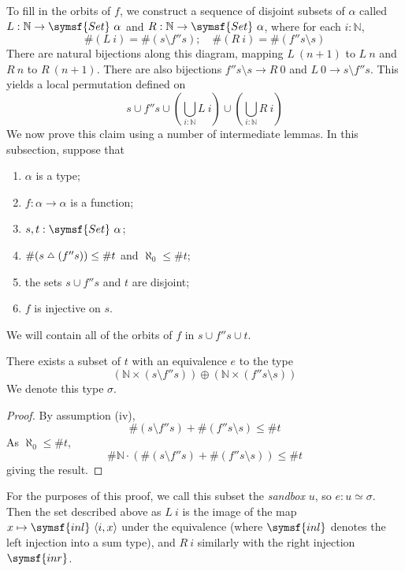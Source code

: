 To fill in the orbits of \( f \), we construct a sequence of disjoint subsets of \( \alpha \) called \( L : \mathbb N \to \symsf{Set}\ \alpha \) and \( R : \mathbb N \to \symsf{Set}\ \alpha \), where for each \( i : \mathbb N \),
\[ \#(L\ i) = \#(s \setminus f '' s);\quad \#(R\ i) = \#(f '' s \setminus s) \]
There are natural bijections along this diagram, mapping \( L\ (n + 1) \) to \( L\ n \) and \( R\ n \) to \( R\ (n + 1) \).
There are also bijections \( f '' s \setminus s \to R\ 0 \) and \( L\ 0 \to s \setminus f '' s \).
This yields a local permutation defined on
\[ s \cup f '' s \cup \left( \bigcup_{i : \mathbb N} L\ i \right) \cup \left( \bigcup_{i : \mathbb N} R\ i \right) \]
We now prove this claim using a number of intermediate lemmas.
In this subsection, suppose that
\begin{enumerate}
    \item \( \alpha \) is a type;
    \item \( f : \alpha \to \alpha \) is a function;
    \item \( s, t : \symsf{Set}\ \alpha \);
    \item \( \#(s \symmdiff (f '' s)) \leq \#t \) and \( \aleph_0 \leq \#t \);
    \item the sets \( s \cup f '' s \) and \( t \) are disjoint;
    \item \( f \) is injective on \( s \).
\end{enumerate}
We will contain all of the orbits of \( f \) in \( s \cup f '' s \cup t \).
\begin{lemma}
    There exists a subset of \( t \) with an equivalence \( e \) to the type
    \[ (\mathbb N \times (s \setminus f '' s)) \oplus (\mathbb N \times (f '' s \setminus s)) \]
    We denote this type \( \sigma \).
\end{lemma}
\begin{proof}
    By assumption (iv),
    \[ \#(s \setminus f '' s) + \#(f '' s \setminus s) \leq \#t \]
    As \( \aleph_0 \leq \#t \),
    \[ \#\mathbb N \cdot (\#(s \setminus f '' s) + \#(f '' s \setminus s)) \leq \#t\]
    giving the result.
\end{proof}
For the purposes of this proof, we call this subset the \emph{sandbox} \( u \), so \( e : u \simeq \sigma \).
Then the set described above as \( L\ i \) is the image of the map \( x \mapsto \symsf{inl}\ \langle i, x \rangle \) under the equivalence (where \( \symsf{inl} \) denotes the left injection into a sum type), and \( R\ i \) similarly with the right injection \( \symsf{inr} \).

